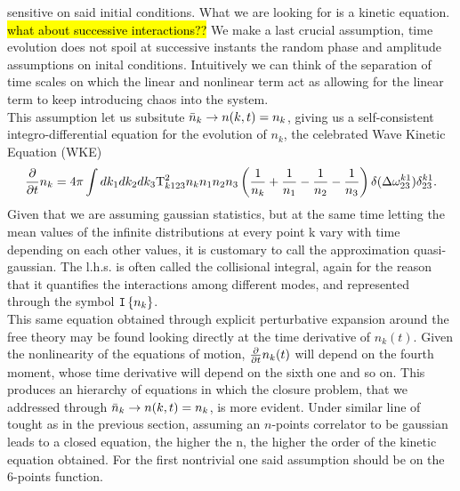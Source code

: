 sensitive on said initial conditions. What we are looking for is a kinetic equation. \hl{what about successive interactions??}
We make a last crucial assumption, time evolution does not spoil at successive instants the random phase and amplitude 
assumptions on inital conditions. Intuitively we can think of the separation of time scales on which the linear and nonlinear term act as allowing for 
the linear term to keep introducing chaos into the system. \\
This assumption let us subsitute $\bar{n}_k \rightarrow n(k,t) = n_k$, giving us a self-consistent integro-differential equation for the evolution of $n_k$, the celebrated
Wave Kinetic Equation (WKE)
\begin{equation}
    \frac{\partial}{\partial t} n_k = 4 \pi\int dk_1 dk_2 dk_3 \\
    \mathrm{T}^2_{k123}n_kn_1n_2n_3
    \left(\frac{1}{n_k} + \frac{1}{n_1} - \frac{1}{n_2}- \frac{1}{n_3}  \right)
    \delta(\Delta{\omega}^{k1}_{23})\delta^{k1}_{23}.
    \label{kinetic}
\end{equation}
Given that we are assuming gaussian statistics, but at the same time letting the mean values of the infinite distributions at every point k 
vary with time depending on each other values, it is customary to call the approximation quasi-gaussian. The l.h.s. is often called the collisional integral, again 
for the reason that it quantifies the interactions among different modes, and represented through the symbol $\mathtt{I}\left\{n_k\right\}$. \\
This same equation obtained through explicit perturbative expansion around the free theory may be found looking directly at the time derivative of $n_k(t)$. 
Given the nonlinearity of the equations of motion, $\frac{\partial}{\partial t} n_k(t)$ will depend on the fourth moment, whose time derivative will depend on the sixth one and so on. 
This produces an hierarchy of equations in which the closure problem, that we addressed through $\bar{n}_k \rightarrow n(k,t) = n_k$, is more evident. Under similar line of tought
as in the previous section, assuming an $n$-points correlator to be gaussian leads to a closed equation, the higher the n, the higher the order of the kinetic equation obtained.
For the first nontrivial one said assumption should be on the 6-points function.\\


